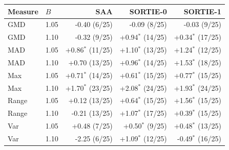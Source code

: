 \begin{tabular}{llrrr}\toprule
Measure & $B$ & SAA & SORTIE-0 & SORTIE-1 \\
\midrule
GMD & 1.05 & -0.40 (6/25) & -0.09 (8/25) & -0.03 (9/25) \\
GMD & 1.10 & -0.32 (9/25) & +0.94$^\ast$ (14/25) & +0.34$^\ast$ (17/25) \\
MAD & 1.05 & +0.86$^\ast$ (11/25) & +1.10$^\ast$ (13/25) & +1.24$^\ast$ (12/25) \\
MAD & 1.10 & +0.70 (13/25) & +0.96$^\ast$ (14/25) & +1.53$^\ast$ (18/25) \\
Max & 1.05 & +0.71$^\ast$ (14/25) & +0.61$^\ast$ (15/25) & +0.77$^\ast$ (15/25) \\
Max & 1.10 & +1.70$^\ast$ (23/25) & +2.08$^\ast$ (24/25) & +1.93$^\ast$ (24/25) \\
Range & 1.05 & +0.12 (13/25) & +0.64$^\ast$ (15/25) & +1.56$^\ast$ (15/25) \\
Range & 1.10 & -0.21 (13/25) & +1.07$^\ast$ (17/25) & +0.39$^\ast$ (15/25) \\
Var & 1.05 & +0.48 (7/25) & +0.50$^\ast$ (9/25) & +0.48$^\ast$ (13/25) \\
Var & 1.10 & -2.25 (6/25) & +1.09$^\ast$ (12/25) & -0.49$^\ast$ (16/25) \\
\bottomrule
\end{tabular}
